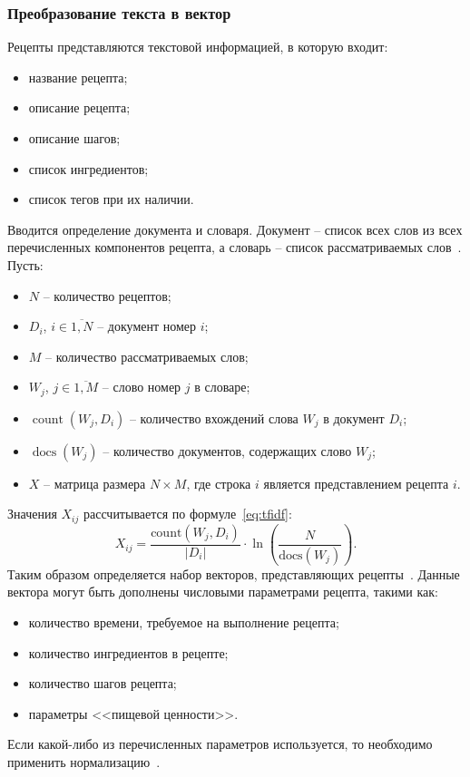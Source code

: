 \subsubsection{Преобразование текста в вектор}
Рецепты представляются текстовой информацией, в которую входит:
\begin{itemize}
    \item название рецепта;
    \item описание рецепта;
    \item описание шагов;
    \item список ингредиентов;
    \item список тегов при их наличии.
\end{itemize}
Вводится определение документа и словаря.
Документ -- список всех слов из всех перечисленных компонентов рецепта, а словарь -- список рассматриваемых слов~\cite{segaran}.
Пусть:
\begin{itemize}
    \item $N$ -- количество рецептов;
    \item $D_i$, $i \in \overline{1,N}$ -- документ номер $i$;
    \item $M$ -- количество рассматриваемых слов;
    \item $W_j$, $j \in \overline{1,M}$ -- слово номер $j$ в словаре;
    \item $\operatorname{count}(W_j, D_i)$ -- количество вхождений слова $W_j$ в документ $D_i$;
    \item $\operatorname{docs}(W_j)$ -- количество документов, содержащих слово $W_j$;
    \item $X$ -- матрица размера $N \times M$, где строка $i$ является представлением рецепта $i$.
\end{itemize}
Значения $X_{ij}$ рассчитывается по формуле~\eqref{eq:tfidf}:
\begin{equation}
    X_{ij} = \frac{\text{count}(W_j, D_i)}{|D_i|} \cdot \ln \left( \frac{N}{\text{docs}(W_j)} \right).
    \label{eq:tfidf}
\end{equation}
Таким образом определяется набор векторов, представляющих рецепты~\cite{salton1975vector}.
Данные вектора могут быть дополнены числовыми параметрами рецепта, такими как:
\begin{itemize}
    \item количество времени, требуемое на выполнение рецепта;
    \item количество ингредиентов в рецепте;
    \item количество шагов рецепта;
    \item параметры <<пищевой ценности>>.
\end{itemize}
Если какой-либо из перечисленных параметров используется, то необходимо применить нормализацию~\cite{sharma2022scaling}.


